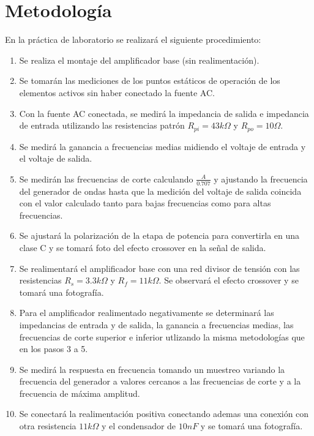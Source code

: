 \documentclass{article}
\begin{document}
\FloatBarrier

\section{Metodología}

En la práctica de laboratorio se realizará el siguiente procedimiento:

\begin{enumerate}
    \item Se realiza el montaje del amplificador base (sin realimentación).
    \item Se tomarán las mediciones de los puntos estáticos de operación de los elementos activos sin haber conectado la fuente AC.
    \item Con la fuente AC conectada, se medirá la impedancia de salida e impedancia de entrada utilizando las resistencias patrón $R_{pi} = 43k\Omega$ y $R_{po}=10\Omega$.
    \item Se medirá la ganancia a frecuencias medias midiendo el voltaje de entrada y el voltaje de salida.
    \item Se medirán las frecuencias de corte calculando $\frac{A}{0.707}$ y ajustando la frecuencia del generador de ondas hasta que la medición del voltaje de salida coincida con el valor calculado tanto para bajas frecuencias como para altas frecuencias.
    \item Se ajustará la polarización de la etapa de potencia para convertirla en una clase C y se tomará foto del efecto crossover en la señal de salida.
    \item Se realimentará el amplificador base con  una red divisor de tensión con las resistencias $R_s= 3.3k\Omega$ y $R_f= 11k\Omega$. Se observará el efecto crossover y se tomará una fotografía.
    \item Para el amplificador realimentado negativamente se determinará las impedancias de entrada y de salida, la ganancia a frecuencias medias, las frecuencias de corte superior e inferior utlizando la misma metodologías que en los pasos 3 a 5.
    \item Se medirá la respuesta en frecuencia tomando un muestreo variando la frecuencia del generador a valores cercanos a las frecuencias de corte y a la frecuencia de máxima amplitud.
    \item Se conectará la realimentación positiva conectando ademas una conexión con otra resistencia $11k\Omega$ y el condensador de $10nF$ y se tomará una fotografía. 
\end{enumerate}
\end{document}
